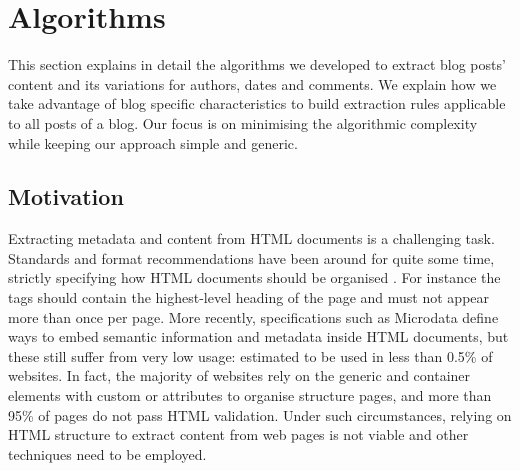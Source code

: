 \section{Algorithms}\label{algorithms}

This section explains in detail the algorithms we developed to extract blog posts' content and its variations for authors, dates and comments.
We explain how we take advantage of blog specific characteristics to build extraction rules applicable to all posts of a blog.
Our focus is on minimising the algorithmic complexity while keeping our approach simple and generic.

\subsection{Motivation}
Extracting metadata and content from HTML documents is a challenging task. Standards and format recommendations have been around for quite some time, strictly specifying how HTML documents should be organised .
For instance the  tags should contain the highest-level heading of the page and must not appear more than once per page\cite{w3c2002}.
More recently, specifications such as Microdata\cite{whatwg2013} define ways to embed semantic information and metadata inside HTML documents, but these still suffer from very low usage: estimated to be used in less than 0.5\%\cite{andrewrogers2013} of websites. In fact, the majority of websites rely on the generic  and  container elements with custom  or  attributes to organise structure pages\cite{brianwilson2008}, and more than 95\% of pages do not pass HTML validation\cite{brianwilson2008-a}. Under such circumstances, relying on HTML structure to extract content from web pages is not viable and other techniques need to be employed.


